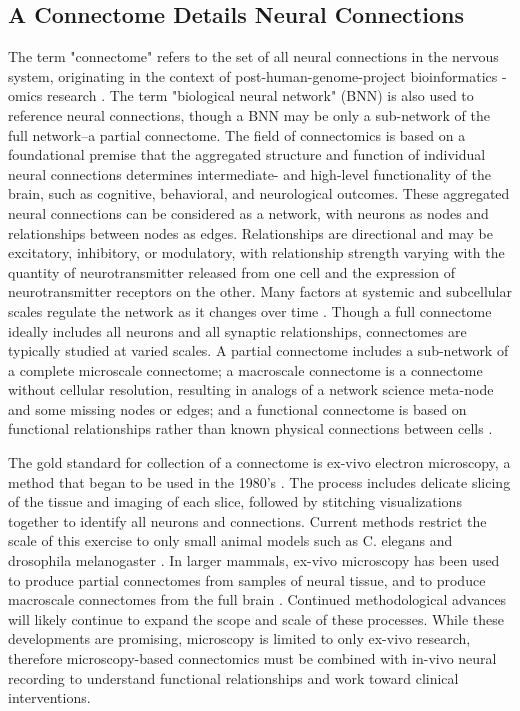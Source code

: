 \documentclass[11pt]{article}
\newcommand{\subsectionwithindent}[1]{
    \subsection*{#1}
    \hspace{\parindent} %
}
\begin{document}
\subsectionwithindent{A Connectome Details Neural Connections}
The term "connectome" refers to the set of all neural connections in the nervous system, originating in the context of post-human-genome-project bioinformatics -omics research \cite{ciarrusta2023connectome, mahapatra2010omics, green2015hgp}. The term "biological neural network" (BNN) \cite{yamazaki2022spiking} is also used to reference neural connections, though a BNN may be only a sub-network of the full network--a partial connectome. The field of connectomics is based on a foundational premise that the aggregated structure and function of individual neural connections determines intermediate- and high-level functionality of the brain, such as cognitive, behavioral, and neurological outcomes. These aggregated neural connections can be considered as a network, with neurons as nodes and relationships between nodes as edges. Relationships are directional and may be excitatory, inhibitory, or modulatory, with relationship strength varying with the quantity of neurotransmitter released from one cell and the expression of neurotransmitter receptors on the other. Many factors at systemic and subcellular scales regulate the network as it changes over time \cite{ciarrusta2023connectome}. Though a full connectome ideally includes all neurons and all synaptic relationships, connectomes are typically studied at varied scales. A partial connectome includes a sub-network of a complete microscale connectome; a macroscale connectome is a connectome without cellular resolution, resulting in analogs of a network science meta-node and some missing nodes or edges; and a functional connectome is based on functional relationships rather than known physical connections between cells \cite{baxter2023functionalconnectome, blommaert2023structuralconnectome, ciarrusta2023connectome, sejnowski2016nanoconnectomics, elam2021hcp}.

The gold standard for collection of a connectome is ex-vivo electron microscopy, a method that began to be used in the 1980's \cite{white1986structure, emmons2015connectomics}. The process includes delicate slicing of the tissue and imaging of each slice, followed by stitching visualizations together to identify all neurons and connections. Current methods restrict the scale of this exercise to only small animal models such as C. elegans and drosophila melanogaster \cite{white1986structure, emmons2015connectomics, scheffer2020connectome}. In larger mammals, ex-vivo microscopy has been used to produce partial connectomes from samples of neural tissue, and to produce macroscale connectomes from the full brain \cite{motta2019connectomicreconstruction, helmstaedter2011high, amunts2013bigbrain}. Continued methodological advances will likely continue to expand the scope and scale of these processes. While these developments are promising, microscopy is limited to only ex-vivo research, therefore microscopy-based connectomics must be combined with in-vivo neural recording to understand functional relationships and work toward clinical interventions.
\end{document}
